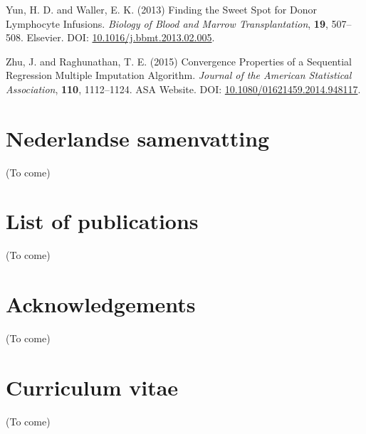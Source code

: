 \documentclass[
  letterpaper,
  DIV=11,
  numbers=noendperiod]{scrreprt}
\newlength{\cslhangindent}
\newenvironment{CSLReferences}[2] %
 {\begin{list}{}{%
  \setlength{\itemindent}{0pt}
  \setlength{\leftmargin}{0pt}
  \setlength{\parsep}{0pt}
  \ifodd #1
   \setlength{\leftmargin}{\cslhangindent}
   \setlength{\itemindent}{-1\cslhangindent}
  \fi
  \setlength{\itemsep}{#2\baselineskip}}}
 {\end{list}}
\begin{document}
\begin{CSLReferences}{1}{1}
Yun, H. D. and Waller, E. K. (2013) Finding the {Sweet Spot} for {Donor
Lymphocyte Infusions}. \emph{Biology of Blood and Marrow
Transplantation}, \textbf{19}, 507--508. Elsevier. DOI:
\href{https://doi.org/10.1016/j.bbmt.2013.02.005}{10.1016/j.bbmt.2013.02.005}.

Zhu, J. and Raghunathan, T. E. (2015) Convergence {Properties} of a
{Sequential Regression Multiple Imputation Algorithm}. \emph{Journal of
the American Statistical Association}, \textbf{110}, 1112--1124. ASA
Website. DOI:
\href{https://doi.org/10.1080/01621459.2014.948117}{10.1080/01621459.2014.948117}.

\end{CSLReferences}


\chapter*{Nederlandse samenvatting}\label{nederlandse-samenvatting}


(To come)


\chapter*{List of publications}\label{list-of-publications}


(To come)


\chapter*{Acknowledgements}\label{acknowledgements}


(To come)


\chapter*{Curriculum vitae}\label{curriculum-vitae}


(To come)
\end{document}
